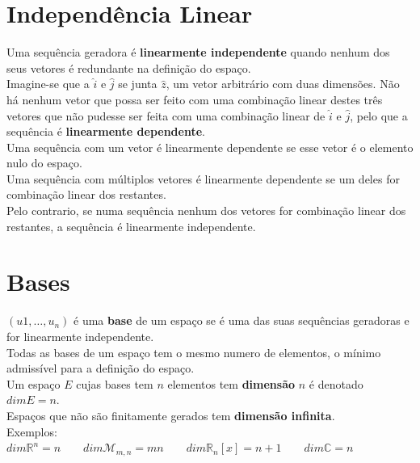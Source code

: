 \documentclass[]{report}
\begin{document}
\section{Independência Linear}
Uma sequência geradora é \textbf{linearmente independente} quando nenhum dos seus vetores é redundante na definição do espaço.\\
Imagine-se que a $\hat{i}$ e $\hat{j}$ se junta $\hat{z}$, um vetor arbitrário com duas dimensões. Não há nenhum vetor que possa ser feito com uma combinação linear destes três vetores que não pudesse ser feita com uma combinação linear de $\hat{i}$ e $\hat{j}$, pelo que a sequência é \textbf{linearmente dependente}.\\[2mm]
Uma sequência com um vetor é linearmente dependente se esse vetor é o elemento nulo do espaço.\\
Uma sequência com múltiplos vetores é linearmente dependente se um deles for combinação linear dos restantes.\\
Pelo contrario, se numa sequência nenhum dos vetores for combinação linear dos restantes, a sequência é linearmente independente.
\section{Bases}
$(u1, \dots, u_n)$ é uma \textbf{base} de um espaço se é uma das suas sequências geradoras e for linearmente independente.\\
Todas as bases de um espaço tem o mesmo numero de elementos, o mínimo admissível para a definição do espaço.\\
Um espaço $E$ cujas bases tem $n$ elementos tem \textbf{dimensão} $n$ é denotado $dim E = n$.\\
Espaços que não são finitamente gerados tem \textbf{dimensão infinita}.\\[2mm]
Exemplos:\\
$dim \mathbb{R}^n = n \quad \quad
dim \mathcal{M}_{m, n} = mn \quad \quad
dim \mathbb{R}_n[x] = n+1 \quad \quad
dim \mathbb{C} = n$
\end{document}
